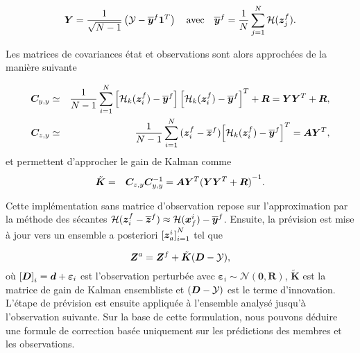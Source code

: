 \begin{equation*}
    \bm Y = \frac{1}{\sqrt{N - 1}} \left(\mathcal Y - \overline{\bm{y}}^f \bm{1}^T \right) \quad \text{avec} \quad \overline{\bm{y}}^f = \frac{1}{N} \sum_{j=1}^{N} \mathcal{H}(\bm{z}_j^f).
\end{equation*}

Les matrices de covariances état et observations sont alors approchées de la manière suivante

\begin{eqnarray*}
    \bm C_{y, y} &\simeq& \frac{1}{N -1} \sum_{i = 1}^{N}\left[ \mathcal{H}_k(\bm{z}_i^f) - \overline{\bm{y}}^f\right] {\left[ \mathcal{H}_k(\bm{z}_i^f) - \overline{\bm{y}}^f\right]}^T + \bm R= \bm Y \bm Y^T + \bm R,\\
    \bm C_{z,y} &\simeq& \frac{1}{N - 1} \sum_{i = 1}^{N} {(\bm{z}_i^f - \overline{\bm{z}}^f)} {\left[ \mathcal{H}_k(\bm{z}_i^f) - \overline{\bm{y}}^f\right]}^T  = \bm A \bm Y^T, \\
\end{eqnarray*}
et permettent d'approcher le gain de Kalman comme
\begin{eqnarray*}
    \tilde{\bm{K}} &=& \bm C_{z,y} \bm C_{y,y}^{-1} = \bm A \bm Y^T {(\bm Y \bm Y^T + \bm R)}^{-1}.
\end{eqnarray*}

Cette implémentation sans matrice d'observation repose sur l'approximation par la méthode des sécantes $\mathcal{H}(\bm{z}_i^f - \overline{\bm{z}}^f) \approx \mathcal{H} (\bm{x}^i_f) - \overline{\bm{y}}^f$.
Ensuite, la prévision est mise à jour vers un ensemble a posteriori ${[\bm{z}^i_a]}_{i=1}^{N}$ tel que

\begin{equation} \label{eq:enkf_formula}
    \bm{Z}^a = \bm{Z}^f + \tilde{\bm{K}} ( \bm{D} - \mathcal{Y}),
\end{equation}
où ${[\bm{D}]}_i = \bm{d} + \bm{\varepsilon}_i$ est l'observation perturbée avec $\bm{\varepsilon}_i \sim \mathcal{N}(\bm{0}, \bm R) $, $\tilde{\bm{K}}$ est la matrice de gain de Kalman ensembliste et $( \bm{D} - \mathcal{Y})$ est le terme d'innovation.
L'étape de prévision est ensuite appliquée à l'ensemble analysé jusqu'à l'observation suivante.
Sur la base de cette formulation, nous pouvons déduire une formule de correction basée uniquement sur les prédictions des membres et les observations.


